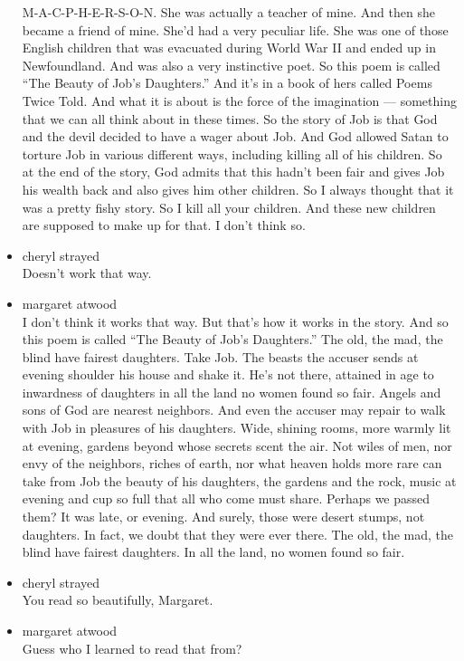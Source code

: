 \begin{itemize}
  M-A-C-P-H-E-R-S-O-N. She was actually a teacher of mine. And then she
  became a friend of mine. She'd had a very peculiar life. She was one
  of those English children that was evacuated during World War II and
  ended up in Newfoundland. And was also a very instinctive poet. So
  this poem is called ``The Beauty of Job's Daughters.'' And it's in a
  book of hers called Poems Twice Told. And what it is about is the
  force of the imagination --- something that we can all think about in
  these times. So the story of Job is that God and the devil decided to
  have a wager about Job. And God allowed Satan to torture Job in
  various different ways, including killing all of his children. So at
  the end of the story, God admits that this hadn't been fair and gives
  Job his wealth back and also gives him other children. So I always
  thought that it was a pretty fishy story. So I kill all your children.
  And these new children are supposed to make up for that. I don't think
  so.
\item
  cheryl strayed\\
  Doesn't work that way.
\item
  margaret atwood\\
  I don't think it works that way. But that's how it works in the story.
  And so this poem is called ``The Beauty of Job's Daughters.'' The old,
  the mad, the blind have fairest daughters. Take Job. The beasts the
  accuser sends at evening shoulder his house and shake it. He's not
  there, attained in age to inwardness of daughters in all the land no
  women found so fair. Angels and sons of God are nearest neighbors. And
  even the accuser may repair to walk with Job in pleasures of his
  daughters. Wide, shining rooms, more warmly lit at evening, gardens
  beyond whose secrets scent the air. Not wiles of men, nor envy of the
  neighbors, riches of earth, nor what heaven holds more rare can take
  from Job the beauty of his daughters, the gardens and the rock, music
  at evening and cup so full that all who come must share. Perhaps we
  passed them? It was late, or evening. And surely, those were desert
  stumps, not daughters. In fact, we doubt that they were ever there.
  The old, the mad, the blind have fairest daughters. In all the land,
  no women found so fair.
\item
  cheryl strayed\\
  You read so beautifully, Margaret.
\item
  margaret atwood\\
  Guess who I learned to read that from?

\end{itemize}
